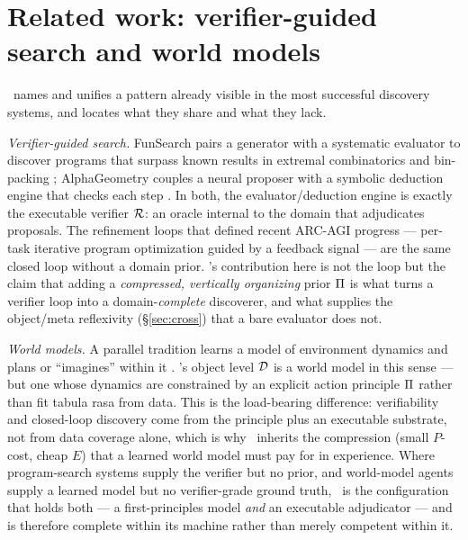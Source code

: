 \section{Related work: verifier-guided search and world models}
\label{sec:related}

\DCI\ names and unifies a pattern already visible in the most successful discovery systems, and locates what they share and what they lack.

\emph{Verifier-guided search.} FunSearch pairs a generator with a systematic evaluator to discover programs that surpass known results in extremal combinatorics and bin-packing \citep{romera2024}; AlphaGeometry couples a neural proposer with a symbolic deduction engine that checks each step \citep{trinh2024}. In both, the evaluator/deduction engine is exactly the executable verifier $\mathcal{R}$: an oracle internal to the domain that adjudicates proposals. The refinement loops that defined recent ARC-AGI progress --- per-task iterative program optimization guided by a feedback signal \citep{cholletarc2026} --- are the same closed loop without a domain prior. \DCI's contribution here is not the loop but the claim that adding a \emph{compressed, vertically organizing} prior $\Pi$ is what turns a verifier loop into a domain-\emph{complete} discoverer, and what supplies the object/meta reflexivity (\S\ref{sec:cross}) that a bare evaluator does not.

\emph{World models.} A parallel tradition learns a model of environment dynamics and plans or ``imagines'' within it \citep{ha2018}. \DCI's object level $\mathcal{D}$ is a world model in this sense --- but one whose dynamics are constrained by an explicit action principle $\Pi$ rather than fit tabula rasa from data. This is the load-bearing difference: verifiability and closed-loop discovery come from the principle plus an executable substrate, not from data coverage alone, which is why \DCI\ inherits the compression (small $P$-cost, cheap $E$) that a learned world model must pay for in experience. Where program-search systems supply the verifier but no prior, and world-model agents supply a learned model but no verifier-grade ground truth, \DCI\ is the configuration that holds both --- a first-principles model \emph{and} an executable adjudicator --- and is therefore complete within its machine rather than merely competent within it.
